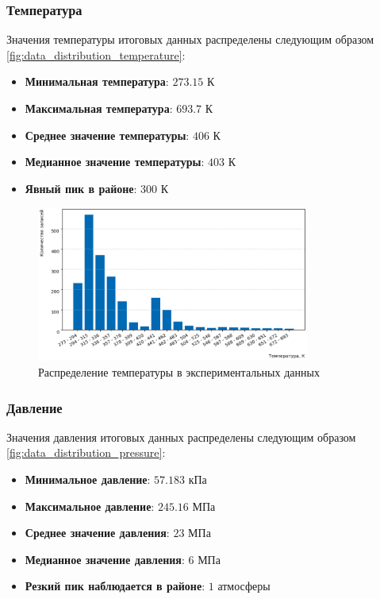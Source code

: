 \documentclass[a4paper,12pt]{article}
\begin{document}
    \subsubsection{Температура}
      Значения температуры итоговых данных распределены следующим образом \autoref{fig:data_distribution_temperature}:
      
      \begin{itemize}
          \item \textbf{Минимальная температура}: \(273.15\) К
          \item \textbf{Максимальная температура}: \(693.7\) К
          \item \textbf{Среднее значение температуры}: \(406\) К
          \item \textbf{Медианное значение температуры}: \(403\) К
          \item \textbf{Явный пик в районе}: \(300\) К
      \end{itemize}
      
      \begin{figure}[ht!]
          \centering
          \includegraphics[width=0.8\textwidth]{data_distribution_temperature.png}
          \caption{Распределение температуры в экспериментальных данных}
          \label{fig:data_distribution_temperature}
      \end{figure}

    \subsubsection{Давление}
    Значения давления итоговых данных распределены следующим образом \autoref{fig:data_distribution_pressure}:

      \begin{itemize}
          \item \textbf{Минимальное давление}: \(57.183\) кПа
          \item \textbf{Максимальное давление}: \(245.16\) МПа
          \item \textbf{Среднее значение давления}: \(23\) МПа
          \item \textbf{Медианное значение давления}: \(6\) МПа
          \item \textbf{Резкий пик наблюдается в районе}: \(1\) атмосферы
      \end{itemize}
\end{document}
